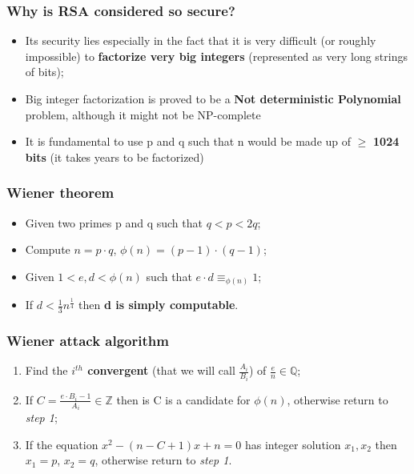 \documentclass{beamer}
\begin{document}
\frame{\sectionpage}


	\begin{frame}
 		 \frametitle{Why is RSA considered so secure?}
			
			\begin{itemize}
			\item Its security lies especially in the fact that it is very difficult (or roughly impossible) to \textbf{factorize very big integers} (represented as very long strings of bits);
			\item Big integer factorization is proved to be a \textbf{Not deterministic Polynomial} problem, although it might not be NP-complete
			\item It is fundamental to use p and q such that n would be made up of $\geq$ \textbf{1024 bits} (it takes years to be factorized)
			\end{itemize}
  		\end{frame}
  		
  \begin{frame}
  \frametitle{Wiener theorem}
    \begin{itemize}
    	\item Given two primes p and q such that $q < p < 2q$;
    	\item Compute $n = p \cdot q$, $\phi(n) = (p-1) \cdot (q-1)$;
    	\item Given $1 < e,d < \phi(n)$ such that $e \cdot d \equiv_{\phi(n)} 1$;
    	\item If $d < \frac { 1 }{ 3 } { n }^{ \frac { 1 }{ 4 }  }$ then \textbf{d is simply computable}.
    \end{itemize}
    
  \end{frame}
  
  \begin{frame}
  \frametitle{Wiener attack algorithm}
  
  \begin{enumerate}
  
  \item Find the \textbf{$i^{th}$ convergent} (that we will call $\frac{A_i}{B_i}$) of $\frac { e }{ n }  \in  \mathbb{Q}$;
  \item If $C = \frac{e \cdot B_i - 1}{A_i} \in \mathbb{Z}$ then is C is a candidate for $\phi(n)$, otherwise return to \textit{step 1};
  \item If the equation ${x}^{2} - (n - C + 1)x + n = 0$ has integer solution $x_1, x_2$ then $x_1 = p$, $x_2 = q$, otherwise return to \textit{step 1}.
  
  \end{enumerate}
  
  \end{frame}
  		
\end{document}
